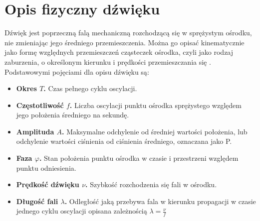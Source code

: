 \documentclass{mwart}
\begin{document}
\section{Opis fizyczny dźwięku}
Dźwięk jest poprzeczną falą mechaniczną rozchodzącą się w sprężystym ośrodku, nie zmieniając jego średniego przemieszczenia. Można go opisać kinematycznie jako formę względnych przemieszczeń cząsteczek ośrodka, czyli jako rodzaj zaburzenia, o określonym kierunku i prędkości przemieszczania się \cite{fahy_sound_2007}.
Podstawowymi pojęciami dla opisu dźwięku są\cite{sen_acoustics_nodate}:
\begin{itemize}
    \item \textbf{Okres $T$.} Czas pełnego cyklu oscylacji.
    \item \textbf{Częstotliwość $f$.} Liczba oscylacji punktu ośrodka sprężystego względem jego położenia średniego na sekundę.
    \item \textbf{Amplituda $A$.} Maksymalne odchylenie od średniej wartości położenia, lub odchylenie wartości ciśnienia od ciśnienia średniego, oznaczana jako P.
    \item \textbf{Faza $\varphi$.} Stan położenia punktu ośrodka w czasie i przestrzeni względem punktu odniesienia.
    \item \textbf{Prędkość dźwięku $\nu$.} Szybkość rozchodzenia się fali w ośrodku.
    \item \textbf{Długość fali $\lambda$.} Odległość jaką przebywa fala w kierunku propagacji w czasie jednego cyklu oscylacji opisana zależnością $\lambda = \frac{\nu}{f}$
\end{itemize}
\end{document}
